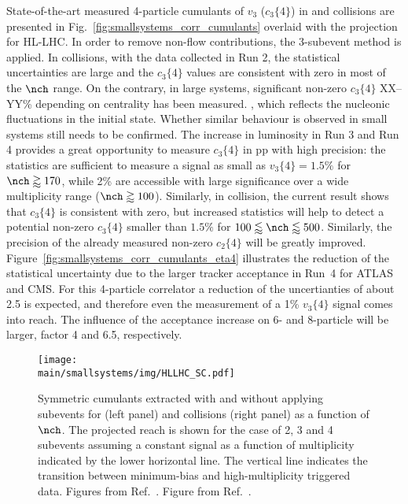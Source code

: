 \documentclass[../report.tex]{subfiles}
\providecommand{\main}{..}
\begin{document}
State-of-the-art measured 4-particle cumulants of $v_3$ ($c_3\{4\}$) in \pp and \pPb collisions are presented in Fig.~\ref{fig:smallsystems_corr_cumulants} overlaid with the projection for HL-LHC.
In order to remove non-flow contributions, the 3-subevent method is applied. In \pp collisions, with the data collected in Run 2, the statistical uncertainties are large and the $c_3\{4\}$ values are consistent with zero in most of the $\nch$ range. On the contrary, in large systems, significant non-zero $c_3\{4\}$ XX--YY\% depending on centrality has been measured.
, which reflects the nucleonic fluctuations in the initial state. Whether similar behaviour is observed in small systems still needs to be confirmed. The increase in luminosity in Run 3 and Run 4 provides a great opportunity to measure $c_3\{4\}$ in pp with high precision: the statistics are sufficient to measure a signal as small as $v_3\{4\} = 1.5\%$ for $\nch \gtrapprox 170$, while 2\% are accessible with large significance over a wide multiplicity range ($\nch \gtrapprox 100$). Similarly, in \pPb collision, the current result shows that $c_3\{4\}$ is consistent with zero, but increased statistics will help to detect a potential non-zero $c_3\{4\}$ smaller than $1.5\%$ for $100 \lessapprox \nch \lessapprox 500$. Similarly, the precision of the already measured non-zero $c_2\{4\}$ will be greatly improved.
Figure~\ref{fig:smallsystems_corr_cumulants_eta4} illustrates the reduction of the statistical uncertainty due to the larger tracker acceptance in Run~4 for ATLAS and CMS. For this 4-particle correlator a reduction of the uncertianties of about 2.5 is expected, and therefore even the measurement of a 1\% $v_3\{4\}$ signal comes into reach. The influence of the acceptance increase on 6- and 8-particle will be larger, factor 4 and 6.5, respectively.

\begin{figure}[t!]
\centering
\texttt{[image: \\main/smallsystems/img/HLLHC\_SC.pdf]}
\caption{Symmetric cumulants extracted with and without applying subevents for \pp (left panel) and \pPb collisions (right panel) as a function of $\nch$. The projected reach is shown for the case of 2, 3 and 4 subevents assuming a constant signal as a function of multiplicity indicated by the lower horizontal line. The vertical line indicates the transition between minimum-bias and high-multiplicity triggered data. Figures from Ref.~\cite{CMS-PAS-FTR-18-026}. Figure from Ref.~\cite{}.}
\label{fig:smallsystems_corr_symmetriccumulants}
\end{figure}
\end{document}
